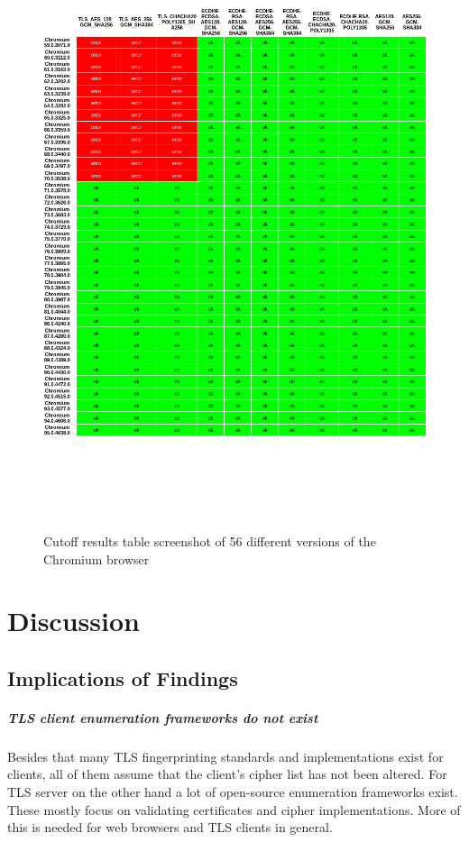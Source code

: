 \documentclass[12pt]{scrbook}
\begin{document}
\begin{figure}[!h]
    \centering
    \includegraphics[height=18cm]{./images/cipher_checker_table.png}
    \caption{Cutoff results table screenshot of 56 different versions of the
        Chromium browser}
\end{figure}

\chapter{Discussion}
\section{Implications of Findings}

\paragraph{TLS client enumeration frameworks do not exist}
Besides that many TLS fingerprinting standards and implementations exist for clients,
all of them assume that the client's cipher list has not been altered. For TLS server on the other hand
a lot of open-source enumeration frameworks exist. These mostly focus on validating certificates and cipher implementations.
More of this is needed for web browsers and TLS clients in general.
\end{document}
